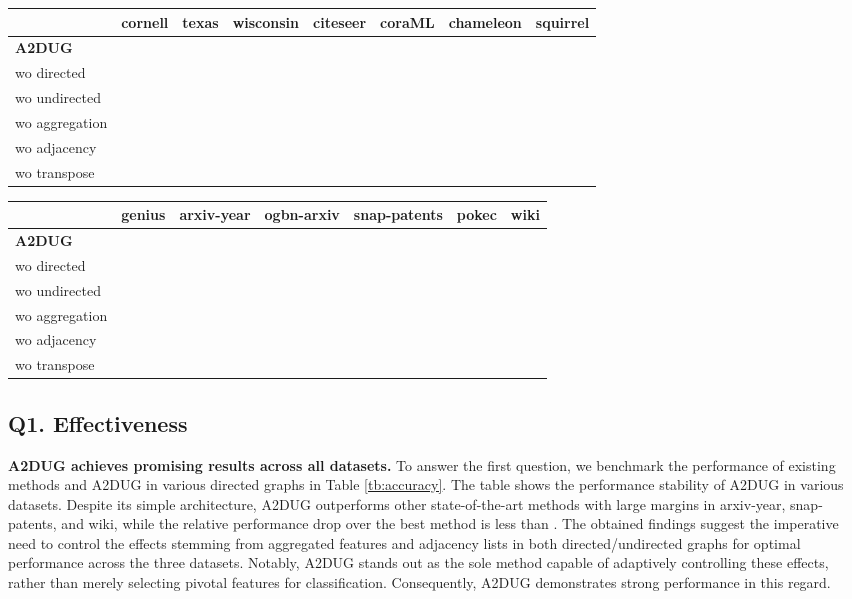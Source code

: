 \begin{table*}[t]
    \caption{Ablation study of A2DUG.
    We highlight the best score on each dataset. 
    }
    \centering

\begin{tabular}{l|ccccccc}
\toprule
 & cornell & texas & wisconsin & citeseer & coraML & chameleon & squirrel \\
\midrule
\textbf{A2DUG} & \colorbox{mycolor}{} &  &  &  &  &  & \colorbox{mycolor}{} \\\midrule
wo directed &  &  &  & \colorbox{mycolor}{} & \colorbox{mycolor}{} &  &  \\
wo undirected &  & \colorbox{mycolor}{} & \colorbox{mycolor}{} &  &  &  &  \\
wo aggregation &  &  &  &  &  &  &  \\
wo adjacency &  &  &  &  &  & \colorbox{mycolor}{} &  \\
wo transpose &  &  &  &  &  &  &  \\
\bottomrule
\end{tabular}

\vspace{3mm}
    

\begin{tabular}{l|ccc|ccc}
\toprule
{}&genius&arxiv-year&ogbn-arxiv&snap-patents&pokec&wiki\\
\midrule
\textbf{\textsc{A2DUG}}&&&&\colorbox{mycolor}{}&&\colorbox{mycolor}{}\\ \midrule
wo directed&\colorbox{mycolor}{}&&\colorbox{mycolor}{}&&\colorbox{mycolor}{}&\\
wo undirected&&\colorbox{mycolor}{}&&&&\\
wo aggregation&&&&&&\\
wo adjacency&&&&&&\\
wo transpose&&&&&&\\
\bottomrule
\end{tabular}
\label{tb:ablation}
\end{table*} 
\subsection{Q1. Effectiveness}
\label{ssec:effectiveness}

\smallskip \noindent \textbf{A2DUG achieves promising results across all datasets. } 
To answer the first question, we benchmark the performance of existing methods and A2DUG in various directed graphs in Table \ref{tb:accuracy}. 
The table shows the performance stability of A2DUG in various datasets. 
Despite its simple architecture, \textsc{A2DUG} outperforms other state-of-the-art methods with large margins in arxiv-year, snap-patents, and wiki, while the relative performance drop over the best method is less than . 
The obtained findings suggest the imperative need to control the effects stemming from aggregated features and adjacency lists in both directed/undirected graphs for optimal performance across the three datasets. 
Notably, A2DUG stands out as the sole method capable of adaptively controlling these effects, rather than merely selecting pivotal features for classification. 
Consequently, A2DUG demonstrates strong performance in this regard.


